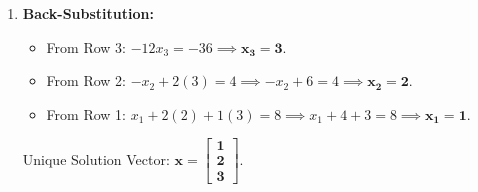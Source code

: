 \begin{enumerate}
    \item \textbf{Back-Substitution:}
    \begin{itemize}
        \item From Row 3: $-12 x_3 = -36 \implies \mathbf{x_3 = 3}$.
        \item From Row 2: $-x_2 + 2(3) = 4 \implies -x_2 + 6 = 4 \implies \mathbf{x_2 = 2}$.
        \item From Row 1: $x_1 + 2(2) + 1(3) = 8 \implies x_1 + 4 + 3 = 8 \implies \mathbf{x_1 = 1}$.
    \end{itemize}
    Unique Solution Vector: $\mathbf{x} = \mathbf{\begin{bmatrix} 1 \\ 2 \\ 3 \end{bmatrix}}$.
\end{enumerate}

